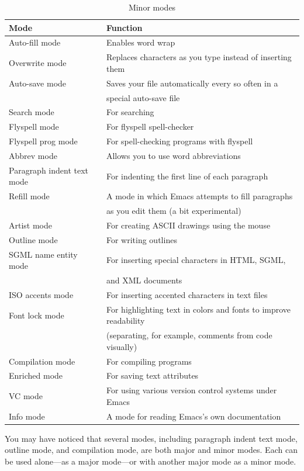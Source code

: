 \documentclass[12pt]{book}
\begin{document}
\begin{table}[H]
	\begin{center}
\begin{tabular}{|l|l|}
\hline
			Mode & Function\\
			\hline
Auto-fill mode & Enables word wrap \\
Overwrite mode & Replaces characters as you type instead of inserting them\\
Auto-save mode & Saves your file automatically every so often in a\\ 
 &special auto-save file\\
Search mode & For searching\\
Flyspell mode & For flyspell spell-checker \\
Flyspell prog mode & For spell-checking programs with flyspell\\
Abbrev mode & Allows you to use word abbreviations\\
Paragraph indent text mode & For indenting the first line of each paragraph \\
Refill mode & A mode in which Emacs attempts to fill paragraphs\\
 &as you edit them (a bit experimental)\\
Artist mode & For creating ASCII drawings using the mouse\\
Outline mode & For writing outlines \\
SGML name entity mode & For inserting special characters in HTML, SGML,\\
 &and XML documents\\
ISO accents mode & For inserting accented characters in text files\\
Font lock mode & For highlighting text in colors and fonts to improve readability \\
 &(separating, for example, comments from code visually)\\
Compilation mode & For compiling programs\\
Enriched mode & For saving text attributes \\
VC mode & For using various version control systems under Emacs\\
Info mode & A mode for reading Emacs's own documentation\\
\hline
\end{tabular}
\end{center}
\caption{Minor modes}
\end{table}
You may have noticed that several modes, including paragraph indent text mode, outline mode, and compilation mode, are both major and minor modes. Each can be used alone—as a major mode—or with another major mode as a minor mode.
\end{document}
